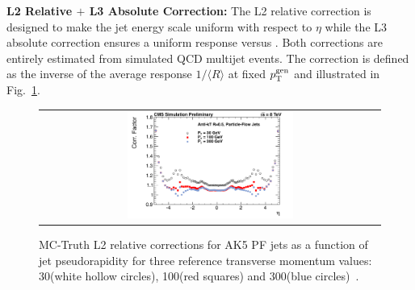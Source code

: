 \begin{description}
 \item \textbf{L2 Relative $+$ L3 Absolute Correction:} The L2 relative correction is designed to make the jet energy scale uniform with respect to $\eta$ while the L3 absolute correction ensures a uniform response versus \pt. Both corrections are entirely estimated from simulated QCD multijet events. The correction is defined as the inverse of the average response $1/\langle R \rangle$ at fixed $p_{\text{T}}^\mathrm{gen}$ and illustrated in Fig.~\ref{fig:l2l3}.
\begin{figure}[!h]
  \centering 
  \begin{tabular}{c}
    \includegraphics[width=0.5\textwidth]{figures/CorrectionVsEta_Overview_TDR_ak5pfl1_L2L3.pdf} 
  \end{tabular}
  \caption{MC-Truth L2 relative corrections for AK5 PF jets as a function of jet pseudorapidity for three reference transverse momentum values: 30\gev (white hollow circles), 100\gev (red squares) and 300\gev (blue circles)~\cite{CMS-DP-2013-033}.}
  \label{fig:l2l3}
\end{figure}


\end{description}

